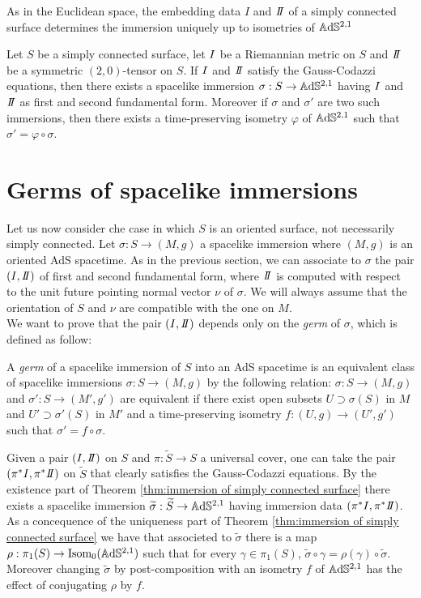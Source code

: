 As in the Euclidean space, the embedding data $I$ and $\II$ of a simply connected surface determines the immersion uniquely up to isometries of $\mathbb{A}\mathrm{d}\mathbb{S}^{2,1}$
\begin{theorem}\label{thm:immersion of simply connected surface}
    Let $S$ be a simply connected surface, let $I$ be a Riemannian metric on $S$ and $\II$ be a symmetric $(2,0)$-tensor on $S$. If $I$ and $\II$ satisfy the Gauss-Codazzi equations, then there exists a spacelike immersion $\sigma:S \to\mathbb{A}\mathrm{d}\mathbb{S}^{2,1}$ having $I$ and $\II$ as first and second fundamental form. Moreover if $\sigma$ and $\sigma'$ are two such immersions, then there exists a time-preserving isometry $\varphi$ of $\mathbb{A}\mathrm{d}\mathbb{S}^{2,1}$ such that $\sigma' = \varphi \circ \sigma$.
\end{theorem}

\section{Germs of spacelike immersions}
Let us now consider che case in which $S$ is an oriented surface, not necessarily simply connected. Let $\sigma: S \to(M,g)$ a spacelike immersion where $(M,g)$ is an oriented AdS spacetime.
As in the previous section, we can associate to $\sigma$ the pair $(\I,\II)$ of first and second  fundamental form, where $\II$ is  computed with respect to the unit future pointing normal vector $\nu$ of $\sigma$.
We will always assume that the orientation of $S$ and $\nu$ are compatible with the one on $M$.\\
We want to prove that the pair $(\I,\II)$ depends only on the \textit{germ} of $\sigma$, which is defined as follow:
\begin{definition}
    A \textit{germ} of a spacelike immersion of $S$ into an AdS spacetime is an equivalent class of spacelike immersions $\sigma:S \to(M,g)$ by the following relation: $\sigma:S \to(M,g)$ and $\sigma':S \to(M',g')$ are equivalent if there exist open subsets $U \supset \sigma(S)$ in $M$ and $U' \supset \sigma'(S)$ in $M'$ and a time-preserving isometry $f:(U,g)\to(U',g')$ such that $\sigma' = f \circ \sigma$.
\end{definition}
Given a pair $(\I,\II)$ on $S$ and $\pi: \widetilde{S}\to S$ a universal cover, one can take the pair $(\pi^*\I, \pi^*\II)$ on $\widetilde{S}$ that clearly satisfies the Gauss-Codazzi equations. By the existence part of Theorem \ref{thm:immersion of simply connected surface} there exists a spacelike immersion $\widetilde{\sigma}: \widetilde{S} \to\mathbb{A}\mathrm{d}\mathbb{S}^{2,1}$ having immersion data $(\pi^*\I, \pi^*\II)$. As a concequence of the uniqueness part of Theorem \ref{thm:immersion of simply connected surface} we have that associeted to $\widetilde{\sigma}$ there is a map $\rho:\pi_1(S) \to \text{Isom}_0(\mathbb{A}\mathrm{d}\mathbb{S}^{2,1})$ such that for every $\gamma \in \pi_1(S)$, $\widetilde{\sigma} \circ \gamma = \rho(\gamma) \circ \widetilde{\sigma}$. Moreover changing $\widetilde{\sigma}$ by post-composition with an isometry $f$ of $\mathbb{A}\mathrm{d}\mathbb{S}^{2,1}$ has the effect of conjugating $\rho$ by $f$.\\
